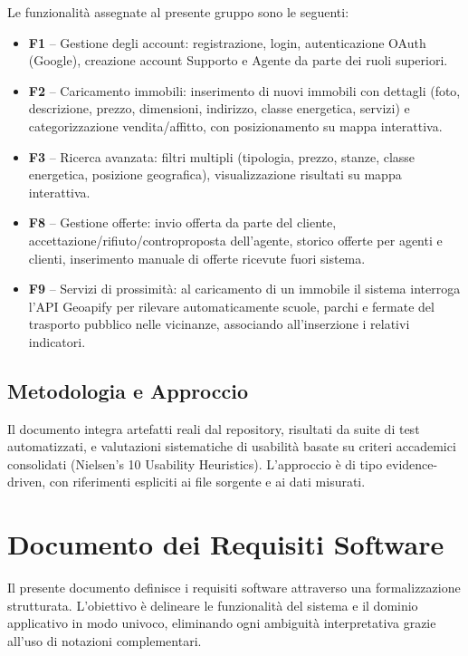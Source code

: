 \documentclass[a4paper,11pt]{article}
\begin{document}
Le funzionalità assegnate al presente gruppo sono le seguenti:
\begin{itemize}
  \item \textbf{F1} -- Gestione degli account: registrazione, login, autenticazione OAuth (Google), creazione account Supporto e Agente da parte dei ruoli superiori.
  \item \textbf{F2} -- Caricamento immobili: inserimento di nuovi immobili con dettagli (foto, descrizione, prezzo, dimensioni, indirizzo, classe energetica, servizi) e categorizzazione vendita/affitto, con posizionamento su mappa interattiva.
  \item \textbf{F3} -- Ricerca avanzata: filtri multipli (tipologia, prezzo, stanze, classe energetica, posizione geografica), visualizzazione risultati su mappa interattiva.
  \item \textbf{F8} -- Gestione offerte: invio offerta da parte del cliente, accettazione/rifiuto/controproposta dell'agente, storico offerte per agenti e clienti, inserimento manuale di offerte ricevute fuori sistema.
  \item \textbf{F9} -- Servizi di prossimità: al caricamento di un immobile il sistema interroga l'API Geoapify per rilevare automaticamente scuole, parchi e fermate del trasporto pubblico nelle vicinanze, associando all'inserzione i relativi indicatori.
\end{itemize}

\subsection*{Metodologia e Approccio}
Il documento integra artefatti reali dal repository, risultati da suite di test automatizzati, e valutazioni sistematiche di usabilità basate su criteri accademici consolidati (Nielsen's 10 Usability Heuristics). L'approccio è di tipo evidence-driven, con riferimenti espliciti ai file sorgente e ai dati misurati.

\newpage
\tableofcontents
\newpage
\listoffigures
\newpage
\section{Documento dei Requisiti Software}

Il presente documento definisce i requisiti software attraverso una formalizzazione strutturata. L'obiettivo è delineare le funzionalità del sistema e il dominio applicativo in modo univoco, eliminando ogni ambiguità interpretativa grazie all'uso di notazioni complementari.
\end{document}
